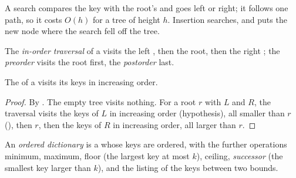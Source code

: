 A search compares the key with the root's and goes left or right; it follows one path, so it costs $O(h)$ for a tree of
height $h$. Insertion searches, and puts the new node where the search fell off the tree.

\label{lst:b1:balanced-trees:floor}

\begin{definition}[Traversals]\label{def:b1:balanced-trees:traversal}
The \emph{in-order traversal} of a  visits the left , then the root, then the
right ; the \emph{preorder} visits the root first, the \emph{postorder} last.
\end{definition}

\begin{proposition}\label{prop:b1:balanced-trees:inorder}
The  of a  visits its keys in increasing order.
\end{proposition}

\begin{proof}
By . The empty tree visits nothing. For a root $r$ with  $L$ and $R$, the traversal visits
the keys of $L$ in increasing order (hypothesis), all smaller than $r$ (), then $r$, then the keys of
$R$ in increasing order, all larger than $r$.
\end{proof}

\begin{definition}\label{def:b1:balanced-trees:ordered}
An \emph{ordered dictionary} is a  whose keys are ordered, with the further
operations minimum, maximum, floor (the largest key at most $k$), ceiling, \emph{successor} (the smallest key larger than $k$), and the listing of the keys between two bounds.
\end{definition}

